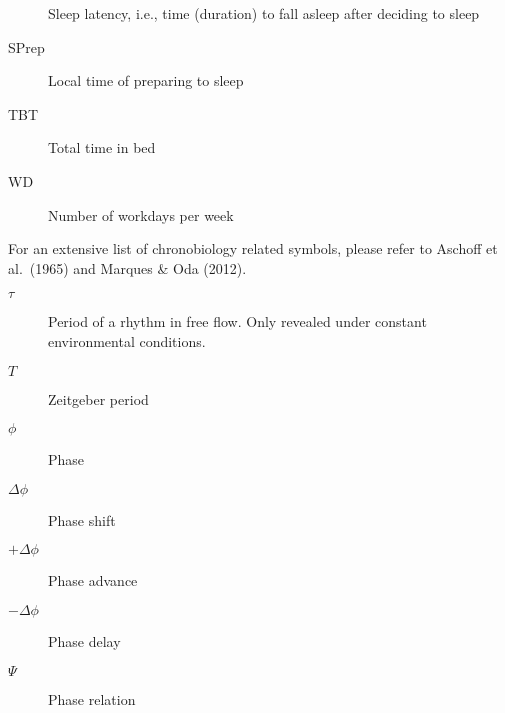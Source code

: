 \begin{siglas}
\begin{description}
Sleep latency, i.e., time (duration) to fall asleep after deciding to
sleep
\item[SPrep]
\hspace{20cm}

Local time of preparing to sleep
\item[TBT]
\hspace{20cm}

Total time in bed
\item[WD]
\hspace{20cm}

Number of workdays per week
\end{description}
\end{siglas}


\setlength{\absparsep}{12pt}
\begin{simbolos}
For an extensive list of chronobiology related symbols, please refer to
Aschoff et al.~(1965) and Marques \& Oda (2012).

\begin{description}
\item[\(\tau\)]
\hspace{20cm}

Period of a rhythm in free flow. Only revealed under constant
environmental conditions.
\item[\(T\)]
\hspace{20cm}

Zeitgeber period
\item[\(\phi\)]
\hspace{20cm}

Phase
\item[\(\Delta\phi\)]
\hspace{20cm}

Phase shift
\item[\(+\Delta\phi\)]
\hspace{20cm}

Phase advance
\item[\(-\Delta\phi\)]
\hspace{20cm}

Phase delay
\item[\(\Psi\)]
\hspace{20cm}

Phase relation
\end{description}
\end{simbolos}

